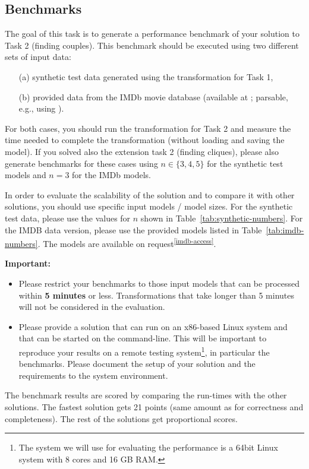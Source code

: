 \documentclass[a4paper,11pt]{article}
\begin{document}
\subsection{Benchmarks}

The goal of this task is to generate a performance benchmark
of your solution to Task 2 (finding couples). This benchmark should be
executed using two different sets of input data:
\begin{enumerate}
\item[(a)] synthetic test data generated using the transformation for Task 1, 
\item[(b)] provided data from the IMDb movie database (available at \cite{IMDBDATA}; parsable, e.g., using \cite{IMDB2EMF}).
\end{enumerate}
For both cases, you should run the transformation for Task 2 
and measure the time needed to complete the transformation 
(without loading and saving the model).
If you solved also the extension task 2 (finding cliques), please also generate
benchmarks for these cases using \(n \in \{3,4,5\}\) for the synthetic test
models and \(n = 3\) for the IMDb models.


In order to evaluate the scalability of the solution and to compare it with other solutions,
you should use specific input models / model sizes. For the synthetic test data, please use
the values for $n$ shown in Table~\ref{tab:synthetic-numbers}. For the IMDB data version,
please use the provided models listed in Table~\ref{tab:imdb-numbers}. The models
are available on request\textsuperscript{\ref{imdb-access}}.


\noindent
\textbf{Important:}
\begin{itemize}
\item Please restrict your benchmarks to those input models that can be
processed within \textbf{5 minutes} or less. Transformations that take longer than 5 minutes
will not be considered in the evaluation.
\item Please provide a solution that can run on an x86-based Linux system and
  that can be started on the command-line. This will be important to reproduce
  your results on a remote testing system\footnote{The system we will use for
    evaluating the performance is a 64bit Linux system with 8 cores and 16 GB
    RAM.}, in particular the benchmarks.  Please document the setup of your
  solution and the requirements to the system environment.
\end{itemize}
The benchmark results are scored by comparing the run-times with the
other solutions. The fastest solution gets 21 points (same amount as for
correctness and completeness). The rest of the solutions get proportional
scores.
\end{document}
